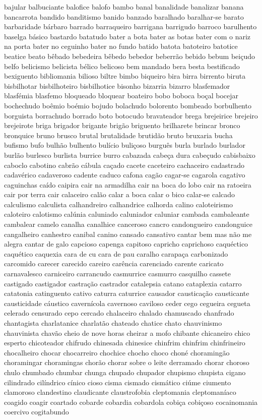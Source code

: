 bajular balbuciante balofice balofo bambo banal banalidade banalizar banana bancarrota bandido banditismo banido banzado baralhado baralhar-se barato barbaridade b\'{a}rbaro barrado barraqueiro barrigana barrigudo barroco barulhento baselga b\'{a}sico bastardo batatudo bater a bota bater as botas bater com o nariz na porta bater no ceguinho bater no fundo batido batota batoteiro batotice beatice beato b\^{e}bado bebedeira b\^{e}bedo bebedor beberr\~ao bebido bebum bei\c{c}udo belfo belicismo belicista b\'{e}lico belicoso bem mandado bera besta bestificado bexiguento bibliomania bilioso biltre bimbo biqueiro bira birra birrento biruta bisbilhotar bisbilhoteiro bisbilhotice bisonho bizarria bizarro blasfemador blasf\'{e}mia blasfemo bloqueado bloquear boateiro bobo boboca bo\c{c}al bocejar bochechudo bo\^{e}mio bo\'{e}mio bojudo bolachudo bolorento bombeado borbulhento borguista borrachudo borrado boto botocudo bravateador brega brejeirice brejeiro brejeirote briga brigador brigante brig\~ao briguento brilharete brincar bronco bronquice bruno brusco brutal brutalidade brutid\~ao bruto bruxaria bucha bufismo bufo bulh\~ao bulhento bul\'{i}cio buli\c{c}oso burgu\^{e}s burla burlado burlador burl\~ao burlesco burlista burrice burro cabazada cabe\c{c}a dura cabe\c{c}udo cabisbaixo caboclo cabotino cabr\~ao c\'{a}bula ca\c{c}ado cacete caceteiro cachaceiro cadastrado cadav\'{e}rico cadaveroso cadente caduco cafona cag\~ao cagar-se cagarola cagativo caguinchas ca\'{i}do caipira cair na armadilha cair na boca do lobo cair na ratoeira cair por terra cair calaceiro cal\~ao calar a boca calar o bico calar-se calcado calculismo calculista calhandreiro calhandrice calhorda calino caloteirismo caloteiro calotismo cal\'{u}nia caluniado caluniador caluniar cambada cambaleante cambalear camelo canalha canalhice canceroso cancro candongueiro candonguice cangalheiro canhestro canibal canino cansado cansativo cantar bem mas n\~ao me alegra cantar de galo capcioso capenga capitoso capricho caprichoso caqu\'{e}ctico caqu\'{e}tico caquexia cara de cu cara de pau caralho carapa\c{c}a carbonizado carcomido carecer carecido careiro car\^{e}ncia carenciado carente caricato carnavalesco carniceiro carrancudo casmurrice casmurro casquilho cassete castigado castigador castra\c{c}\~ao castrador catalepsia catano cataplexia catarro catatonia catinguento cativo caturra caturrice causador caustica\c{c}\~ao causticante causticidade c\'{a}ustico cavern\'{i}cola cavernoso caviloso ceder cego cegueira cegueta celerado censurado cepo cercado chalaceiro chalado chamuscado chanfrado chantagista charlatanice charlat\~ao chateado chatice chato chauvinismo chauvinista chav\~ao cheio de nove horas cheirar a mofo chibante chicaneiro chico esperto chicoteador chifrudo chinesada chinesice chinfrim chinfrim chinfrineiro chocalheiro chocar chocarreiro chochice chocho choco chon\'{e} choraming\~ao choramingar choramingas chor\~ao chorar sobre o leite derramado chorar choroso chulo chumbado chumbar chunga chupado chupador chupismo chupista cigano cilindrado cil\'{i}ndrico c\'{i}nico cioso cisma cismado cism\'{a}tico ci\'{u}me ciumento clamoroso clandestino claudicante claustrofobia cleptomania cleptoman\'{i}aco coagido coagir coartado cobarde cobardia cobardola cobi\c{c}a cobi\c{c}oso cocainomania coercivo cogitabundo 